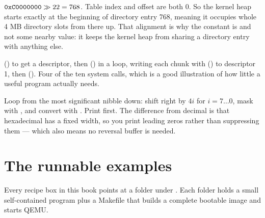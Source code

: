 \begin{description}[leftmargin=0pt,style=nextline,font=\bfseries\color{accent}]
\item[26.1 Splitting \hexa{C0000000}]
$\texttt{0xC0000000} \gg 22 = 768$. Table index and offset are both 0. So the kernel heap starts exactly
at the beginning of directory entry 768, meaning it occupies whole 4 MB directory slots from there
up. That alignment is why the constant is  and not some nearby value: it keeps the
kernel heap from sharing a directory entry with anything else.

\item[7.1 Which calls \cod{cat file.txt} needs]
 () to get a descriptor, then  () in a loop, writing each chunk
with  () to descriptor 1, then  (). Four of the ten system
calls, which is a good illustration of how little a useful program actually needs.

\item[20.1 \cod{vga\_text\_write\_hex}]
Loop from the most significant nibble down: shift right by $4i$ for $i = 7 \ldots 0$, mask with
, and convert with . Print  first. The
difference from decimal is that hexadecimal has a fixed width, so you print leading zeros rather than
suppressing them --- which also means no reversal buffer is needed.

\end{description}

\chapter{The runnable examples}

Every recipe box in this book points at a folder under
. Each folder holds a small self-contained program plus a
Makefile that builds a complete bootable image and starts QEMU.

